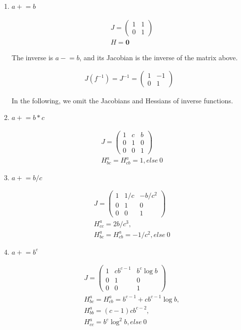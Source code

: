 \documentclass{article}
\newcommand{\<}{\langle}
\renewcommand{\>}{\rangle}
\theoremstyle{definition}\newtheorem{definition}{\textit{Definition}}
\begin{document}
\begin{multicols}{2}
\begin{enumerate}
    \item $a \mathrel+= b$

\begin{align*}
    &J = \left(\begin{matrix}
1 & 1\\
0 & 1
\end{matrix}\right)\\
    &H = \mathbf{0}
\end{align*}

The inverse is $a \mathrel-= b$, and its Jacobian is the inverse of the matrix above.

\begin{align*}
J(f^{-1}) = J^{-1} = \left(\begin{matrix}
1 & -1\\
0 & 1
\end{matrix}\right)
\end{align*}

In the following, we omit the Jacobians and Hessians of inverse functions.

\item $a\mathrel+=b*c$

\begin{align*}
    &J = \left(\begin{matrix}
1 & c & b\\
0 & 1 & 0\\
0 & 0 & 1
\end{matrix}\right)\\
    &H^a_{bc} = H^a_{cb} = 1, else ~0
\end{align*}

\item $a\mathrel+=b/c$

\begin{align*}
    &J = \left(\begin{matrix}
1 & 1/c &-b/c^2\\
0 & 1 & 0\\
0 & 0 & 1
\end{matrix}\right)\\
    &H^a_{cc} = 2b/c^3,\\
    &H^a_{bc} = H^a_{cb} = -1/c^2, else ~ 0
\end{align*}

\item $a\mathrel+=b^c$


\begin{align*}
    &J = \left(\begin{matrix}
1 &  cb^{c-1} &   b^c \log b \\
0 & 1 & 0\\
0 & 0 & 1
\end{matrix}\right)\\
    &H^a_{bc} = H^a_{cb} = b^{c-1} + c b^{c-1}\log b,\\
    &H^a_{bb} = (c-1)c b^{c-2},\\
    &H^a_{cc} = b^c\log^2b, else ~0
\end{align*}


\end{enumerate}
\end{multicols}
\end{document}
